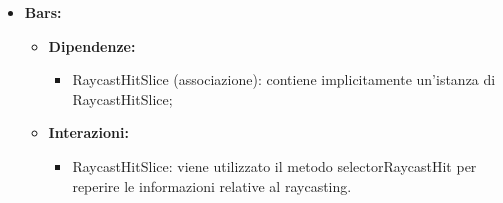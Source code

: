 \begin{itemize}
      \item \textbf{Bars:}
            \begin{itemize}
                  \item \textbf{Dipendenze:}
                        \begin{itemize}
                              \item RaycastHitSlice (associazione): contiene implicitamente un'istanza di
                                    RaycastHitSlice;
                        \end{itemize}
                  \item \textbf{Interazioni:}
                        \begin{itemize}
                              \item RaycastHitSlice: viene utilizzato il metodo selectorRaycastHit per reperire le
                                    informazioni relative al raycasting.
                        \end{itemize}
            \end{itemize}
\end{itemize}

